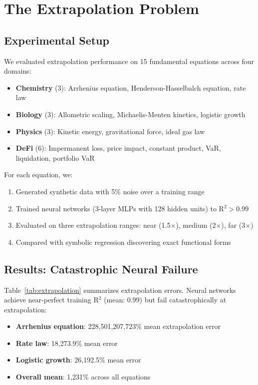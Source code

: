 \documentclass[twoside,11pt]{article}
\begin{document}
\section{The Extrapolation Problem}
\label{sec:extrapolation}

\subsection{Experimental Setup}

We evaluated extrapolation performance on 15 fundamental equations across four domains:
\begin{itemize}
\item \textbf{Chemistry} (3): Arrhenius equation, Henderson-Hasselbalch equation, rate law
\item \textbf{Biology} (3): Allometric scaling, Michaelis-Menten kinetics, logistic growth
\item \textbf{Physics} (3): Kinetic energy, gravitational force, ideal gas law
\item \textbf{DeFi} (6): Impermanent loss, price impact, constant product, VaR, liquidation, portfolio VaR
\end{itemize}

For each equation, we:
\begin{enumerate}
\item Generated synthetic data with 5\% noise over a training range
\item Trained neural networks (3-layer MLPs with 128 hidden units) to R$^2 > 0.99$
\item Evaluated on three extrapolation ranges: near (1.5$\times$), medium (2$\times$), far (3$\times$)
\item Compared with symbolic regression discovering exact functional forms
\end{enumerate}

\subsection{Results: Catastrophic Neural Failure}

Table~\ref{tab:extrapolation} summarizes extrapolation errors. Neural networks achieve near-perfect training R$^2$ (mean: 0.99) but fail catastrophically at extrapolation:

\begin{itemize}
\item \textbf{Arrhenius equation}: 228,501,207,723\% mean extrapolation error
\item \textbf{Rate law}: 18,273.9\% mean error  
\item \textbf{Logistic growth}: 26,192.5\% mean error
\item \textbf{Overall mean}: 1,231\% across all equations
\end{itemize}
\end{document}
